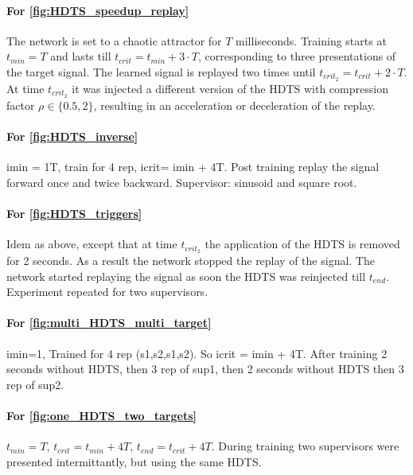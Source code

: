 \documentclass[10pt,a4paper, final]{report} %
\begin{document}
\paragraph{For \autoref{fig:HDTS_speedup_replay}}
The network is set to a chaotic attractor  for $T$ milliseconds. Training starts at $t_{min} = T$ and lasts till $t_{crit} = t_{min} + 3 \cdot T$, corresponding to three presentations of the target signal. The learned signal is replayed two times until $t_{crit_2} = t_{crit} + 2 \cdot T$. 
At time $t_{crit_2}$ it was injected a different version of the HDTS with compression factor $\rho \in \{0.5, 2\}$, resulting in an acceleration or deceleration of the replay.

\paragraph{For \autoref{fig:HDTS_inverse}}
imin = 1T, train for 4 rep, icrit= imin + 4T. Post training replay the signal forward once and twice backward. Supervisor: sinusoid and square root.

\paragraph{For \autoref{fig:HDTS_triggers}}
Idem as above, except that at time $t_{crit_2}$ the application of the HDTS is removed for 2 seconds. As a result the network stopped the replay of the signal. The network started replaying the signal as soon the HDTS was reinjected till $t_{end}$. Experiment repeated for two supervisors.

\paragraph{For \autoref{fig:multi_HDTS_multi_target}}
imin=1,
Trained for 4 rep (s1,s2,s1,s2). So icrit = imin + 4T.
After training 2 seconds without HDTS, then 3 rep of sup1, then 2 seconds without HDTS then 3 rep of sup2.

\paragraph{For \autoref{fig:one_HDTS_two_targets}}
$t_{min} = T$, $t_{crit} = t_{min} + 4 T$, $t_{end} = t_{crit} + 4T$. During training two supervisors were presented intermittantly, but using the same HDTS.
\end{document}
